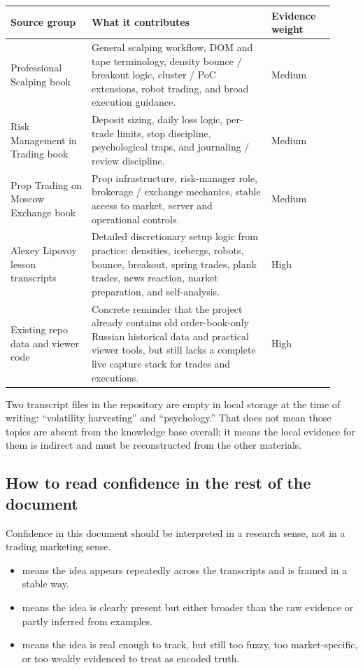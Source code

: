 \begin{longtable}{p{0.23\linewidth} p{0.51\linewidth} p{0.18\linewidth}}
\toprule
\textbf{Source group} & \textbf{What it contributes} & \textbf{Evidence weight} \\
\midrule
\endhead
Professional Scalping book & General scalping workflow, DOM and tape terminology, density bounce / breakout logic, cluster / PoC extensions, robot trading, and broad execution guidance. & Medium \\
Risk Management in Trading book & Deposit sizing, daily loss logic, per-trade limits, stop discipline, psychological traps, and journaling / review discipline. & Medium \\
Prop Trading on Moscow Exchange book & Prop infrastructure, risk-manager role, brokerage / exchange mechanics, stable access to market, server and operational controls. & Medium \\
Alexey Lipovoy lesson transcripts & Detailed discretionary setup logic from practice: densities, icebergs, robots, bounce, breakout, spring trades, plank trades, news reaction, market preparation, and self-analysis. & High \\
Existing repo data and viewer code & Concrete reminder that the project already contains old order-book-only Russian historical data and practical viewer tools, but still lacks a complete live capture stack for trades and executions. & High \\
\bottomrule
\end{longtable}

Two transcript files in the repository are empty in local storage at the time of writing:
``volatility harvesting'' and ``psychology.'' That does not mean those topics are absent from
the knowledge base overall; it means the local evidence for them is indirect and must be
reconstructed from the other materials.

\subsection{How to read confidence in the rest of the document}

Confidence in this document should be interpreted in a research sense, not in a trading
marketing sense.

\begin{itemize}[leftmargin=1.4em]
  \item {} means the idea appears repeatedly across the transcripts and is framed
        in a stable way.
  \item {} means the idea is clearly present but either broader than the raw
        evidence or partly inferred from examples.
  \item {} means the idea is real enough to track, but still too fuzzy, too
        market-specific, or too weakly evidenced to treat as encoded truth.
\end{itemize}

